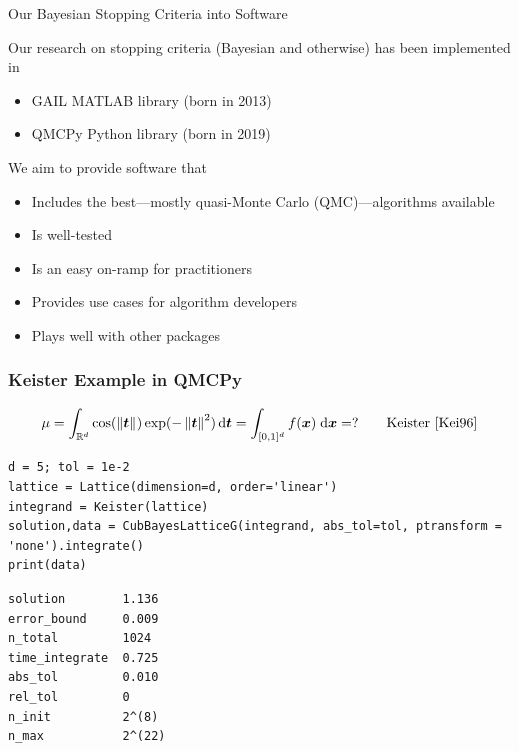 \documentclass[11pt,compress,xcolor={usenames,dvipsnames},aspectratio=169]{beamer}
\begin{document}
\begin{frame}{Our Bayesian Stopping Criteria into Software}
	
	\vspace{-3ex}
	
	Our research on stopping criteria (Bayesian and otherwise) has been implemented in
	\begin{itemize}
		\item GAIL \cite{ChoEtal21a} MATLAB library (born in 2013)
		\item QMCPy \cite{QMCPy2020a} Python library (born in 2019)
	\end{itemize}
We aim to provide software that 
\begin{itemize}
	\item Includes the best---mostly quasi-Monte Carlo (QMC)---algorithms available
	\item Is well-tested
	\item Is an easy on-ramp for practitioners
	\item Provides use cases for algorithm developers 
	\item Plays well with other packages
\end{itemize}
	
	
\end{frame}
	

\begin{frame}[fragile]\frametitle{Keister Example in QMCPy \href{https://colab.research.google.com/drive/1KrlrtLu7j8Ff7YsSJjPMiGUr-UKfqwxm?usp=sharing}{}}
	\vspace{-5ex}
	\[
	\mu = \int_{\mathbb{R}^d} \cos(\left \lVert \boldsymbol{t} \right \rVert_{{}}) \exp(-\left \lVert \boldsymbol{t} \right \rVert_{{}}^2) \, {\rm d} \boldsymbol{t} = \int_{[0,1]^d} f(\boldsymbol{x}) \; {\rm d} \boldsymbol{x} =  ? \qquad \text{Keister \cite{Kei96}}
	\]
\noindent\begin{minipage}{0.47\textwidth}
\begin{lstlisting}[style=Python]
d = 5; tol = 1e-2
lattice = Lattice(dimension=d, order='linear')
integrand = Keister(lattice)
solution,data = CubBayesLatticeG(integrand, abs_tol=tol, ptransform = 'none').integrate()
print(data)
\end{lstlisting}
\end{minipage} 
\qquad
\begin{minipage}{0.47\textwidth}
\begin{lstlisting}[style=Python]
solution        1.136
error_bound     0.009
n_total         1024
time_integrate  0.725
abs_tol         0.010
rel_tol         0
n_init          2^(8)
n_max           2^(22)
\end{lstlisting}
\end{minipage} 

\end{frame}
\end{document}
